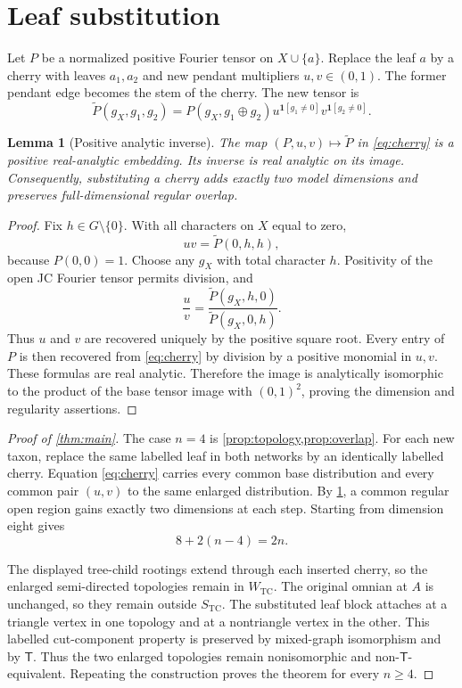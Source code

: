 \documentclass[11pt]{article}
\newtheorem{lemma}[theorem]{Lemma}
\theoremstyle{remark}
\newcommand{\TCw}{W_{\mathrm{TC}}}
\newcommand{\TCs}{S_{\mathrm{TC}}}
\newcommand{\Tmove}{\mathsf T}
\newcommand{\xor}{\mathbin\oplus}
\begin{document}
\section{Leaf substitution}

Let $P$ be a normalized positive Fourier tensor on $X\cup\{a\}$.  Replace
the leaf $a$ by a cherry with leaves $a_1,a_2$ and new pendant multipliers
$u,v\in(0,1)$.  The former pendant edge becomes the stem of the cherry.  The
new tensor is
\begin{equation}\label{eq:cherry}
\widetilde P(g_X,g_1,g_2)=
P(g_X,g_1\xor g_2)
u^{\mathbf1[g_1\ne0]}v^{\mathbf1[g_2\ne0]}.
\end{equation}

\begin{lemma}[Positive analytic inverse]\label{lem:cherry}
The map $(P,u,v)\mapsto\widetilde P$ in \eqref{eq:cherry} is a positive
real-analytic embedding.  Its inverse is real analytic on its image.
Consequently, substituting a cherry adds exactly two model dimensions and
preserves full-dimensional regular overlap.
\end{lemma}

\begin{proof}
Fix $h\in G\setminus\{0\}$.  With all characters on $X$ equal to zero,
\[
uv=\widetilde P(0,h,h),
\]
because $P(0,0)=1$.  Choose any $g_X$ with total character $h$.  Positivity of
the open JC Fourier tensor permits division, and
\[
\frac uv=
\frac{\widetilde P(g_X,h,0)}{\widetilde P(g_X,0,h)}.
\]
Thus $u$ and $v$ are recovered uniquely by the positive square root.  Every
entry of $P$ is then recovered from \eqref{eq:cherry} by division by a
positive monomial in $u,v$.  These formulas are real analytic.  Therefore
the image is analytically isomorphic to the product of the base tensor image
with $(0,1)^2$, proving the dimension and regularity assertions.
\end{proof}

\begin{proof}[Proof of \cref{thm:main}]
The case $n=4$ is \cref{prop:topology,prop:overlap}.  For each new taxon,
replace the same labelled leaf in both networks by an identically labelled
cherry.  Equation \eqref{eq:cherry} carries every common base distribution
and every common pair $(u,v)$ to the same enlarged distribution.  By
\cref{lem:cherry}, a common regular open region gains exactly two dimensions
at each step.  Starting from dimension eight gives
\[
8+2(n-4)=2n.
\]

The displayed tree-child rootings extend through each inserted cherry, so
the enlarged semi-directed topologies remain in $\TCw$.  The original
omnian at $A$ is unchanged, so they remain outside $\TCs$.  The substituted
leaf block attaches at a triangle vertex in one topology and at a
nontriangle vertex in the other.  This labelled cut-component property is
preserved by mixed-graph isomorphism and by $\Tmove$.  Thus the two enlarged
topologies remain nonisomorphic and non-$\Tmove$-equivalent.  Repeating the
construction proves the theorem for every $n\ge4$.
\end{proof}
\end{document}
